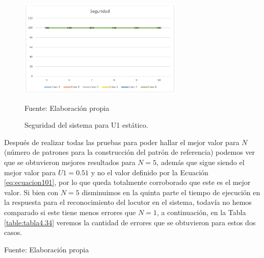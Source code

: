 \begin{figure}[H]
\begin{center}
\includegraphics[width=0.7\textwidth]{Imagenes/Cap4/image010}
\end{center}
\begin{center}
\vskip -0.5cm
\caption{\small{Seguridad del sistema para U1 estático.}}
\label{fig:figura4.10}
{\small{Fuente: Elaboración propia}}
\end{center}
\end{figure}

Después de realizar todas las pruebas para poder hallar el mejor valor para $N$ (número de patrones para la construcción del patrón de referencia) podemos ver que se obtuvieron mejores resultados para $N = 5$, además que sigue siendo el mejor valor para $U1 = 0.51$ y no el valor definido por la Ecuación \eqref{eq:ecuacion101}, por lo que queda totalmente corroborado que este es el mejor valor. 
\vskip 0.5cm
Si bien con $N = 5$ disminuimos en la quinta parte el tiempo de ejecución en la respuesta para el reconocimiento del locutor en el sistema, todavía no hemos comparado si este tiene menos errores que $N = 1$, a continuación, en la Tabla \ref{table:tabla4.34} veremos la cantidad de errores que se obtuvieron para estos dos casos.

\begin{center}
\begin{table}[H]
\centering
\caption{\small{Comparación de numero de errores entre U1 = U y U1 = 0.51.}}
\label{table:tabla4.34}
\vskip 0.2cm
\begin{center}
\vskip 0.2cm
{\small{Fuente: Elaboración propia}}
\end{center}
\end{table}
\end{center}

